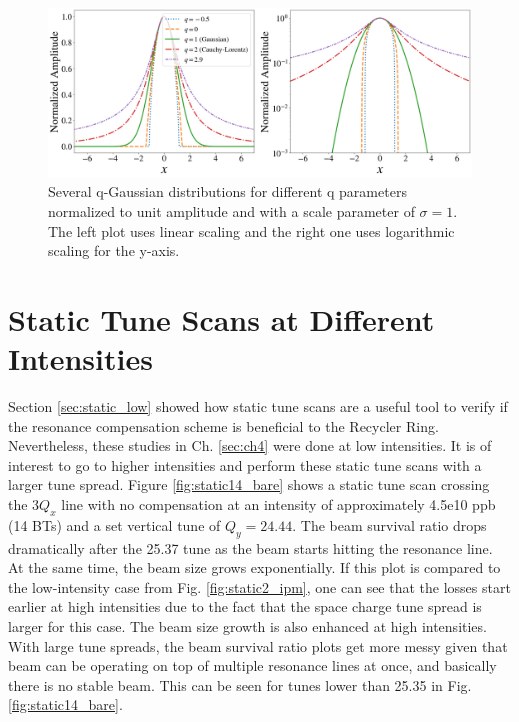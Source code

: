 \begin{figure}[H]
    \centering
    \includegraphics[width=\textwidth,keepaspectratio]{chapter6/qgaussians.png}
    \caption{Several q-Gaussian distributions for different q parameters normalized to unit amplitude and with a scale parameter of $\sigma=1$. The left plot uses linear scaling and the right one uses logarithmic scaling for the y-axis.}
    \label{fig:qgaussians}
\end{figure}


\section{\label{sec:static_high}Static Tune Scans at Different Intensities}

Section \ref{sec:static_low} showed how static tune scans are a useful tool to verify if the resonance compensation scheme is beneficial to the Recycler Ring. Nevertheless, these studies in Ch. \ref{sec:ch4} were done at low intensities. It is of interest to go to higher intensities and perform these static tune scans with a larger tune spread. Figure \ref{fig:static14_bare} shows a static tune scan crossing the $3Q_x$ line with no compensation at an intensity of approximately 4.5e10 ppb (14 BTs) and a set vertical tune of $Q_y=24.44$. The beam survival ratio drops dramatically after the 25.37 tune as the beam starts hitting the resonance line. At the same time, the beam size grows exponentially. If this plot is compared to the low-intensity case from Fig. \ref{fig:static2_ipm}, one can see that the losses start earlier at high intensities due to the fact that the space charge tune spread is larger for this case. The beam size growth is also enhanced at high intensities. With large tune spreads, the beam survival ratio plots get more messy given that beam can be operating on top of multiple resonance lines at once, and basically there is no stable beam. This can be seen for tunes lower than 25.35 in Fig. \ref{fig:static14_bare}. 

